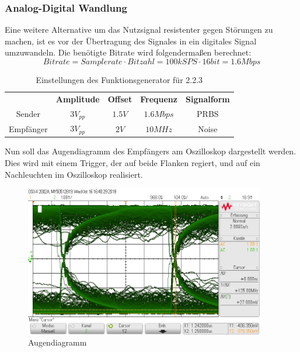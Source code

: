 \documentclass[a4paper,12pt]{article}
\begin{document}
	\subsubsection{Analog-Digital Wandlung}
	Eine weitere Alternative um das Nutzsignal resistenter gegen Störungen zu machen, ist es vor der Übertragung des Signales in ein digitales Signal umzuwandeln. Die benötigte Bitrate wird folgendermaßen berechnet:
	\[
		Bitrate = Samplerate \cdot Bitzahl = 100kSPS \cdot 16bit = 1.6Mbps
	\]
	\begin{table}[h]
		\centering
		\begin{tabular}{|c|c|c|c|c|}
			\hline
			\multirow{2}{*}{} & \multirow{2}{*}{\textbf{Amplitude}} & \multirow{2}{*}{\textbf{Offset}} & \multirow{2}{*}{\textbf{Frequenz}} & \multirow{2}{*}{\textbf{Signalform}} \\
			&  &  &  &  \\ \hline
			\multirow{2}{*}{Sender} & \multirow{2}{*}{$3V_{pp}$} & \multirow{2}{*}{$1.5V$} & \multirow{2}{*}{$1.6Mbps$} & \multirow{2}{*}{PRBS} \\
			&  &  &  &  \\ \hline
			\multirow{2}{*}{Empfänger} & \multirow{2}{*}{$3V_{pp}$} & \multirow{2}{*}{$2V$} & \multirow{2}{*}{$10MHz$} & \multirow{2}{*}{Noise} \\
			&  &  &  &  \\ \hline
		\end{tabular}
		\caption{Einstellungen des Funktionsgenerator für 2.2.3}
	\end{table}
	\newline
	Nun soll das Augendiagramm des Empfängers am Oszilloskop dargestellt werden. Dies wird mit einem Trigger, der auf beide Flanken regiert, und auf ein Nachleuchten im Oszilloskop realisiert.
	\begin{figure}[h]
		\centering
		\includegraphics[width=10.5cm]{img/Augendiagramm}
		\caption{Augendiagramm}
	\end{figure}
\end{document}
